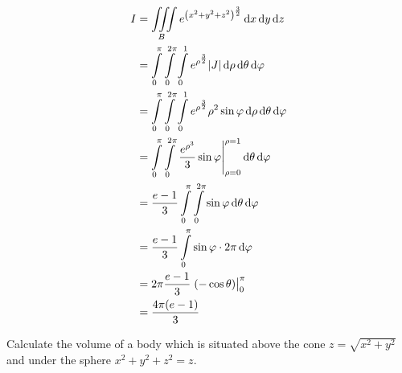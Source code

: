 \documentclass[fleqn, a4paper, 8pt, twoside]{amsart}
\theoremstyle{definition}
\theoremstyle{bluedefinition}
\theoremstyle{redtheorem}
\begin{document}
\begin{multicols}{2}
\begin{spacing}{0.7}
\begin{solution}
	\begin{align*}
		I & = \iiint\limits_{B} e^{\left( x^2 + y^2 + z^2 \right)^{\frac{3}{2}}} \dif x \dif y \dif z                                                         \\
                  & = \int\limits_{0}^{\pi} \int\limits_{0}^{2 \pi} \int\limits_{0}^{1} e^{\rho^{\frac{3}{2}}} |J| \dif \rho \dif \theta \dif \varphi                 \\
                  & = \int\limits_{0}^{\pi} \int\limits_{0}^{2 \pi} \int\limits_{0}^{1} e^{\rho^{\frac{3}{2}}} \rho^2 \sin \varphi \dif \rho \dif \theta \dif \varphi \\
                  & = \int\limits_{0}^{\pi} \int\limits_{0}^{2 \pi} \left. \frac{e^{\rho^3}}{3} \sin \varphi \right|_{\rho = 0}^{\rho = 1} \dif \theta \dif \varphi   \\
                  & = \frac{e - 1}{3} \int\limits_{0}^{\pi} \int\limits_{0}^{2 \pi} \sin \varphi \dif \theta \dif \varphi                                             \\
                  & = \frac{e - 1}{3} \int\limits_{0}^{\pi} \sin \varphi \cdot 2 \pi \dif \varphi                                                                     \\
                  & = 2 \pi \frac{e - 1}{3} \left. (- \cos \theta) \right|_{0}^{\pi}                                                                                  \\
                  & = \frac{4 \pi (e - 1)}{3}
	\end{align*}
\end{solution}

\begin{question}
	Calculate the volume of a body which is situated above the cone $z = \sqrt{x^2 + y^2}$ and under the sphere $x^2 + y^2 + z^2 = z$.
\end{question}


\end{spacing}
\end{multicols}
\end{document}
